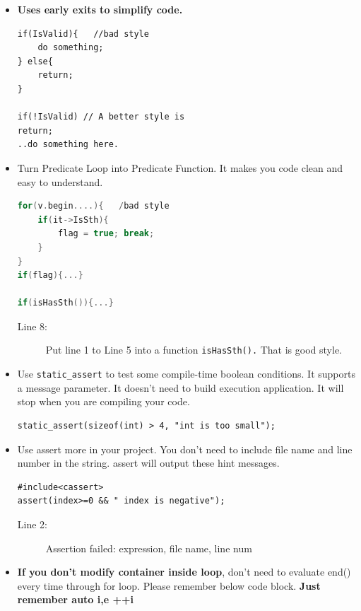 \documentclass[a4paper,11pt,twoside]{book}
\begin{document}
\begin{itemize}
	\item \textbf{Uses early exits to simplify code.}
	
\begin{lstlisting}[numbers=none]
if(IsValid){   //bad style
	do something;
} else{
	return;
}
	
if(!IsValid) // A better style is
return;
..do something here.
	\end{lstlisting}
	
	\item Turn Predicate Loop into Predicate Function. It makes you code clean and easy to understand.
	
\begin{lstlisting}[frame=single, language=c++]
for(v.begin....){   /bad style
	if(it->IsSth){
		flag = true; break;
	}
}
if(flag){...}
	
if(isHasSth()){...}
\end{lstlisting}
\begin{description}
	\item[Line 8:] Put line 1 to Line 5 into a function \texttt{isHasSth().} That is good style.
\end{description}
	
	\item Use \texttt{static\_assert} to test some compile-time boolean conditions. It supports a message parameter. It doesn't need to build execution application. It will stop when you are compiling your code. 
\begin{lstlisting}[numbers=none]
static_assert(sizeof(int) > 4, "int is too small");
\end{lstlisting}
	
	\item Use assert more in your project. You don't need to include file name and line number in the string. assert will output these hint messages.
\begin{lstlisting}[numbers=none]
#include<cassert>
assert(index>=0 && " index is negative");
\end{lstlisting}
\begin{description}
	\item[Line 2:] Assertion failed: expression, file name, line num
\end{description}

	
	\item \textbf{If you don't modify container inside loop}, don't need to evaluate end() every time through for loop. Please remember below code block. \textbf{Just remember auto i,e ++i}


\end{itemize}
\end{document}
